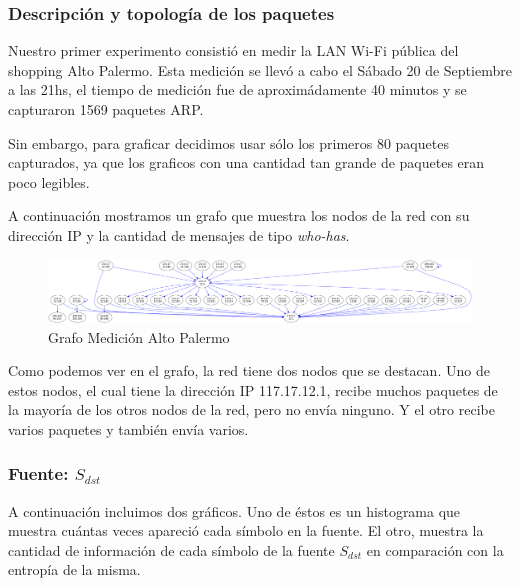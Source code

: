 \subsubsection{Descripción y topología de los paquetes}

Nuestro primer experimento consistió en medir la LAN Wi-Fi pública del shopping Alto Palermo. Esta medición se llevó a cabo el Sábado 20 de Septiembre a las 21hs, el tiempo de medición fue de aproximádamente 40 minutos y se capturaron 1569 paquetes ARP.

Sin embargo, para graficar decidimos usar sólo los primeros 80 paquetes capturados, ya que los graficos con una cantidad tan grande de paquetes eran poco legibles.

A continuación mostramos un grafo que muestra los nodos de la red con su dirección IP y la cantidad de mensajes de tipo \emph{who-has}.

\begin{figure}[H]
 \begin{center}
  \includegraphics[width=\linewidth]{../imgs/snifAlto-ips_red.png}
  \caption{Grafo Medición Alto Palermo}
 \end{center}

\end{figure}

Como podemos ver en el grafo, la red tiene dos nodos que se destacan. Uno de estos nodos, el cual tiene la dirección IP 117.17.12.1, recibe muchos paquetes de la mayoría de los otros nodos de la red, pero no envía ninguno. Y el otro recibe varios paquetes y también envía varios.

\subsubsection{Fuente: $S_{dst}$}

A continuación incluimos dos gráficos. Uno de éstos es un histograma que muestra cuántas veces apareció cada símbolo en la fuente. El otro, muestra la cantidad de información de cada símbolo de la fuente $S_{dst}$ en comparación con la entropía de la misma. 


